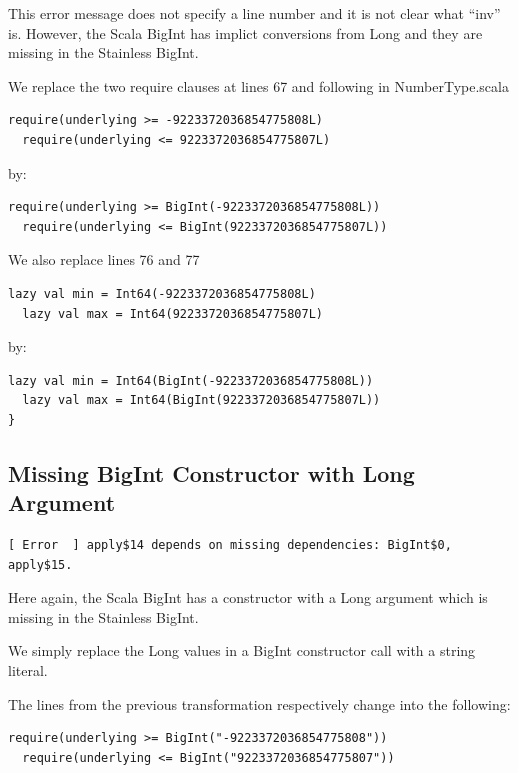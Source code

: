 \documentclass[runningheads]{llncs}
\begin{document}
This error message does not specify a line number and it is not clear
what ``inv'' is. However, the Scala BigInt has implict conversions
from Long and they are missing in the Stainless BigInt.



We replace the two require clauses at lines 67 and following in NumberType.scala

\begin{lstlisting}[style=scala]
  require(underlying >= -9223372036854775808L)
  require(underlying <= 9223372036854775807L)
\end{lstlisting}

by:
\begin{lstlisting}[style=scala]
  require(underlying >= BigInt(-9223372036854775808L))
  require(underlying <= BigInt(9223372036854775807L))
\end{lstlisting}

We also replace lines 76 and 77
\begin{lstlisting}[style=scala]
  lazy val min = Int64(-9223372036854775808L)
  lazy val max = Int64(9223372036854775807L)
\end{lstlisting}

by:
\begin{lstlisting}[style=scala]
  lazy val min = Int64(BigInt(-9223372036854775808L))
  lazy val max = Int64(BigInt(9223372036854775807L))
}
\end{lstlisting}


\subsection{Missing BigInt Constructor with Long Argument}

\begin{lstlisting}[style=stainless]
[ Error  ] apply$14 depends on missing dependencies: BigInt$0, apply$15.
\end{lstlisting}

Here again, the Scala BigInt has a constructor with a Long argument
which is missing in the Stainless BigInt.

We simply replace the Long values in a BigInt constructor call with a string
literal.

The lines from the previous transformation respectively change into
the following:

\begin{lstlisting}[style=scala]
  require(underlying >= BigInt("-9223372036854775808"))
  require(underlying <= BigInt("9223372036854775807"))
\end{lstlisting}
\end{document}
